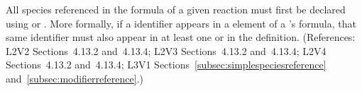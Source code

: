 All species referenced in the \StoichiometryMath formula of a given
reaction must first be declared using \SpeciesReference or
\ModifierSpeciesReference.  More formally, if a \Species identifier appears
in a  element of a \Reaction's \StoichiometryMath formula, that
same identifier must also appear in at least one \SpeciesReference or
\ModifierSpeciesReference in the \Reaction definition.  (References: L2V2
Sections~4.13.2 and~4.13.4; L2V3 Sections~4.13.2 and~4.13.4; L2V4 Sections~4.13.2 and~4.13.4;
L3V1 Sections~\ref{subsec:simplespeciesreference}
and~\ref{subsec:modifierreference}.)
